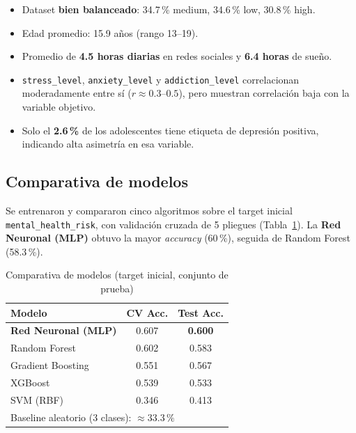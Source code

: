 \documentclass[11pt,twocolumn]{article}
\begin{document}
\begin{itemize}[leftmargin=12pt, itemsep=0pt, parsep=2pt]
  \item Dataset \textbf{bien balanceado}: 34.7\,\% medium, 34.6\,\% low,
        30.8\,\% high.
  \item Edad promedio: 15.9 a\~nos (rango 13--19).
  \item Promedio de \textbf{4.5 horas diarias} en redes sociales y
        \textbf{6.4 horas} de sue\~no.
  \item \texttt{stress\_level}, \texttt{anxiety\_level} y
        \texttt{addiction\_level} correlacionan moderadamente entre s\'i
        ($r \approx 0.3$--$0.5$), pero muestran correlaci\'on baja con
        la variable objetivo.
  \item Solo el \textbf{2.6\,\%} de los adolescentes tiene etiqueta de
        depresi\'on positiva, indicando alta asimetr\'ia en esa variable.
\end{itemize}

\subsection{Comparativa de modelos}

Se entrenaron y compararon cinco algoritmos sobre el target inicial
\texttt{mental\_health\_risk}, con validaci\'on cruzada de 5 pliegues
(Tabla~\ref{tab:modelos}). La \textbf{Red Neuronal (MLP)} obtuvo la mayor
\textit{accuracy} (60\,\%), seguida de Random Forest (58.3\,\%).

\begin{table}[H]
\centering
\caption{Comparativa de modelos (target inicial, conjunto de prueba)}
\label{tab:modelos}
\small
\begin{tabular}{lcc}
\toprule
\textbf{Modelo} & \textbf{CV Acc.} & \textbf{Test Acc.} \\
\midrule
\rowcolor{lightrow} \textbf{Red Neuronal (MLP)} & 0.607 & \textbf{0.600} \\
Random Forest                                    & 0.602 & 0.583 \\
\rowcolor{lightrow} Gradient Boosting            & 0.551 & 0.567 \\
XGBoost                                          & 0.539 & 0.533 \\
\rowcolor{lightrow} SVM (RBF)                    & 0.346 & 0.413 \\
\bottomrule
\multicolumn{3}{l}{\footnotesize Baseline aleatorio (3 clases): $\approx 33.3\,\%$} \\
\end{tabular}
\end{table}
\end{document}
